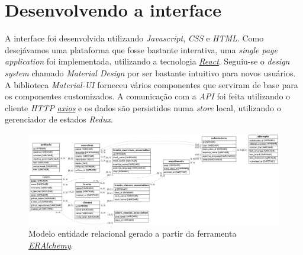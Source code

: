 \section{Desenvolvendo a interface}
A interface foi desenvolvida utilizando \emph{Javascript}, \emph{CSS} e \emph{HTML}. Como 
desejávamos uma plataforma que fosse bastante interativa, uma \emph{single page application} 
foi implementada, utilizando a tecnologia \hyperref[link:react]{\emph{React}}.
Seguiu-se o \emph{design system} chamado 
\emph{Material Design} por ser bastante intuitivo para novos usuários. A biblioteca \emph{Material-UI} 
forneceu vários componentes que serviram de base para os componentes customizados. A comunicação com a 
\emph{API} foi feita utilizando o cliente \emph{HTTP} \hyperref[link:axios]{\emph{axios}} e 
os dados são persistidos numa \emph{store} local, utilizando o gerenciador de estados \emph{Redux}.

\begin{figure}
    \centering
    \includegraphics[width=\linewidth]{images/db_schema}
    \caption{Modelo entidade relacional gerado a partir da ferramenta \hyperref[link:eralchemy]{\emph{ERAlchemy}}.}\label{fig:mer}
\end{figure}